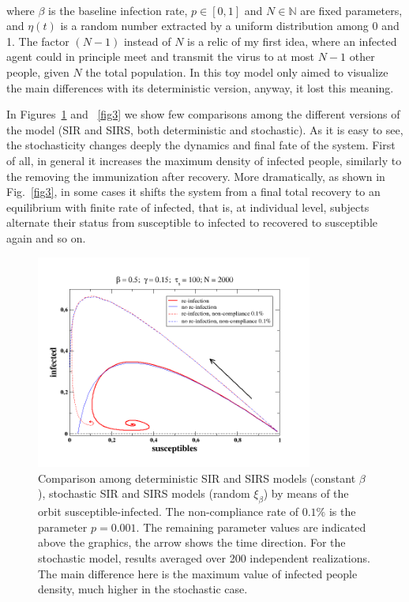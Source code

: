 \documentclass{article}
\begin{document}
\ 

\noindent where $\beta$ is the baseline infection rate, $p\in[0,1]$ and $N\in\mathbb{N}$ are fixed parameters, and $\eta(t)$ is a random number extracted by a uniform distribution among 0 and 1. The factor $(N-1)$ instead of $N$ is a relic of my first idea, where an infected agent could in principle meet and transmit the virus to at most $N-1$ other people, given $N$ the total population. In this toy model only aimed to visualize the main differences with its deterministic version, anyway, it lost this meaning.

In Figures~\ref{fig2} and ~\ref{fig3} we show few comparisons among the different versions of the model (SIR and SIRS, both deterministic and stochastic). As it is easy to see, the stochasticity changes deeply the dynamics and final fate of the system. First of all, in general it increases the maximum density of infected people, similarly to the removing the immunization after recovery. More dramatically, as shown in Fig.~\ref{fig3}, in some cases it shifts the system from a final total recovery to an equilibrium with finite rate of infected, that is, at individual level, subjects alternate their status from susceptible to infected to recovered to susceptible again and so on.

\begin{figure}
  \centering
  \includegraphics[width=91mm]{Fig2.png}
  \caption{Comparison among deterministic SIR and SIRS models (constant $\beta$), stochastic SIR and SIRS models (random $\xi_\beta$) by means of the orbit susceptible-infected. The non-compliance rate of $0.1\%$ is the parameter $p=0.001$. The remaining parameter values are indicated above the graphics, the arrow shows the time direction. For the stochastic model, results averaged over 200 independent realizations. The main difference here is the maximum value of infected people density, much higher in the stochastic case.}
  \label{fig2}
\end{figure}
\end{document}
